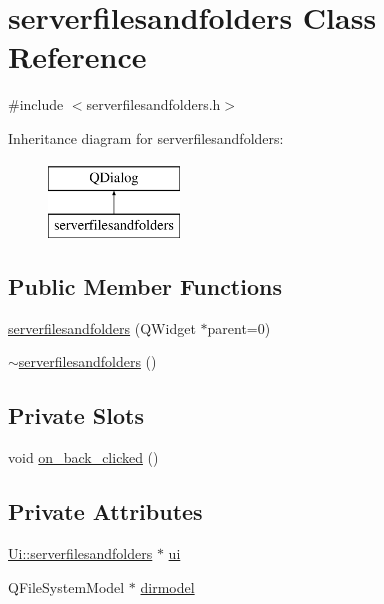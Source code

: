 \hypertarget{classserverfilesandfolders}{\section{serverfilesandfolders Class Reference}
\label{classserverfilesandfolders}
}


{\ttfamily \#include $<$serverfilesandfolders.\-h$>$}

Inheritance diagram for serverfilesandfolders\-:\begin{figure}[H]
\begin{center}
\leavevmode
\includegraphics[height=2.000000cm]{classserverfilesandfolders}
\end{center}
\end{figure}
\subsection*{Public Member Functions}
\begin{DoxyCompactItemize}
\item 
\hyperlink{classserverfilesandfolders_abfa0e6264d2ce565a7ab53df5da280f3}{serverfilesandfolders} (Q\-Widget $\ast$parent=0)
\item 
\hyperlink{classserverfilesandfolders_acfbe1a58fddff5f5ddff72d311485541}{$\sim$serverfilesandfolders} ()
\end{DoxyCompactItemize}
\subsection*{Private Slots}
\begin{DoxyCompactItemize}
\item 
void \hyperlink{classserverfilesandfolders_a5e5a22a47b29c34c588fb8ed4123f4ad}{on\-\_\-back\-\_\-clicked} ()
\end{DoxyCompactItemize}
\subsection*{Private Attributes}
\begin{DoxyCompactItemize}
\item 
\hyperlink{classUi_1_1serverfilesandfolders}{Ui\-::serverfilesandfolders} $\ast$ \hyperlink{classserverfilesandfolders_ad4869db2d9cec9cc8703f75471a3067b}{ui}
\item 
Q\-File\-System\-Model $\ast$ \hyperlink{classserverfilesandfolders_ab95bcb566830347d44645fa00ba78b80}{dirmodel}
\end{DoxyCompactItemize}


